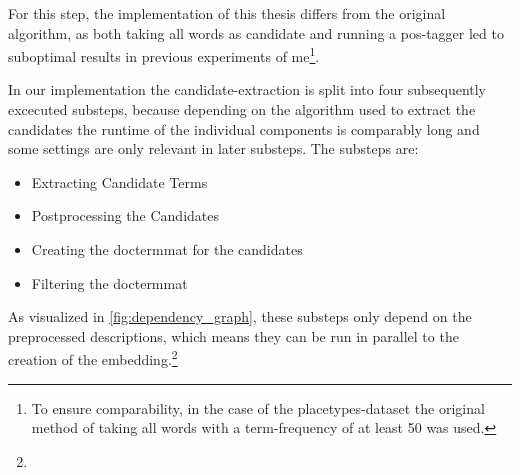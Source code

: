 For this step, the implementation of this thesis differs from the original algorithm, as both taking all words as candidate and running a \gls{pos}-tagger led to suboptimal results in previous experiments of me\footnote{To ensure comparability, in the case of the placetypes-dataset the original method of taking all words with a term-frequency of at least 50 was used.}. 





In our implementation the candidate-extraction is split into four subsequently excecuted substeps, because depending on the algorithm used to extract the candidates the runtime of the individual components is comparably long and some settings are only relevant in later substeps. The substeps are:
\begin{itemize}
	\item Extracting Candidate Terms
	\item Postprocessing the Candidates
	\item Creating the \gls{doctermmat} for the candidates
	\item Filtering the \gls{doctermmat}
\end{itemize}

As visualized in \autoref{fig:dependency_graph}, these substeps only depend on the preprocessed descriptions, which means they can be run in parallel to the creation of the embedding.\footnote{}


